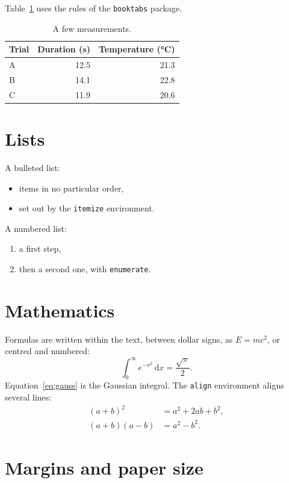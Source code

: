 \documentclass{article}
\begin{document}
Table~\ref{tab:measurements} uses the rules of the \texttt{booktabs}
package.

\begin{table}[htbp]
  \centering
  \caption{A few measurements.}
  \label{tab:measurements}
  \begin{tabular}{lrr}
    \toprule
    Trial & Duration (s) & Temperature (°C) \\
    \midrule
    A & 12.5 & 21.3 \\
    B & 14.1 & 22.8 \\
    C & 11.9 & 20.6 \\
    \bottomrule
  \end{tabular}
\end{table}

\section{Lists}

A bulleted list:
\begin{itemize}
  \item items in no particular order,
  \item set out by the \texttt{itemize} environment.
\end{itemize}
A numbered list:
\begin{enumerate}
  \item a first step,
  \item then a second one, with \texttt{enumerate}.
\end{enumerate}

\section{Mathematics}

Formulas are written within the text, between dollar signs, as $E = mc^2$,
or centred and numbered:
\begin{equation}
  \int_0^{\infty} e^{-x^2} \, \mathrm{d}x = \frac{\sqrt{\pi}}{2}.
  \label{eq:gauss}
\end{equation}
Equation~\eqref{eq:gauss} is the Gaussian integral. The \texttt{align}
environment aligns several lines:
\begin{align}
  (a + b)^2 &= a^2 + 2ab + b^2, \\
  (a + b)(a - b) &= a^2 - b^2.
\end{align}

\section{Margins and paper size}
\end{document}

